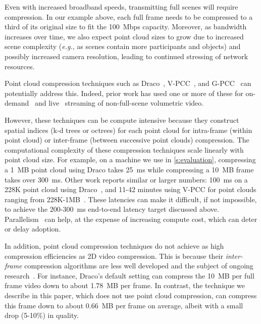 %
Even with increased broadband speeds, transmitting full scenes will require compression.
%
In our example above, each full frame needs to be compressed to a third of its original size to fit the 100~Mbps capacity.
%
Moreover, as bandwidth increases over time, we also expect point cloud sizes to grow due to increased scene complexity (\textit{e.g.}, as scenes contain more participants and objects) and possibly increased camera resolution, leading to continued stressing of network resources.

Point cloud compression techniques such as Draco~\cite{draco}, V-PCC~\cite{vpcc}, and G-PCC~\cite{gpcc} can potentially address this.
%
Indeed, prior work has used one or more of these for on-demand~\cite{groot,vivo} and live~\cite{metastream} streaming of non-full-scene volumetric video.

However, these techniques can be compute intensive because they construct spatial indices (k-d trees or octrees) for each point cloud for intra-frame (within point cloud) or inter-frame (between successive point clouds) compression.
%
The computational complexity of these compression techniques scale linearly with point cloud size.
%
For example, on a machine we use in \cref{s:evaluation}, compressing a 1~MB point cloud using Draco takes 25~ms while compressing a 10~MB frame takes over 300~ms.
%
Other work reports similar or larger numbers: 100~ms on a 228K point cloud using Draco~\cite{vivo}, and 11-42 minutes using V-PCC for point clouds ranging from 228K-1MB~\cite{groot}.
%
These latencies can make it difficult, if not impossible, to achieve the 200-300~ms end-to-end latency target discussed above.
%
Parallelism~\cite{vivo,metastream} can help, at the expense of increasing compute cost, which can deter or delay adoption. %

In addition, point cloud compression techniques do not achieve as high compression efficiencies as 2D video compression.
%
This is because their \textit{inter-frame} compression algorithms are less well developed and the subject of ongoing research~\cite{pcc-future}.
%
For instance, Draco's default setting can compress the 10~MB per full frame video down to about 1.78~MB per frame.
%
In contrast, the technique we describe in this paper, which does not use point cloud compression, can compress this frame down to about 0.66~MB per frame on average, albeit with a small drop (5-10\%) in quality.

